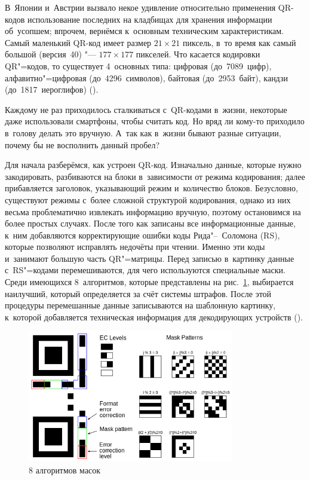 \documentclass[final,pdftex]{../../template/epsilonj}
\begin{document}
В~Японии и~Австрии вызвало некое удивление относительно применения QR-кодов использование последних на кладбищах для хранения информации об~усопшем; впрочем, вернёмся к~основным техническим характеристикам. Самый маленький QR-код имеет размер $21\times21$ пиксель, в~то время как самый большой (версия~40) "--- $177\times177$ пикселей. Что касается кодировки QR"=кодов, то существует 4~основных типа: цифровая (до~7089~цифр), алфавитно"=цифровая (до~4296~символов), байтовая (до~2953~байт), кандзи (до~1817~иероглифов) (\cite{WikiQRCodeRu}).

Каждому не раз приходилось сталкиваться с~QR-кодами в~жизни, некоторые даже использовали смартфоны, чтобы считать код. Но вряд ли кому-то приходило в~голову делать это вручную. А~так как в~жизни бывают разные ситуации, почему бы не восполнить данный пробел?

Для начала разберёмся, как устроен QR-код. Изначально данные, которые нужно закодировать, разбиваются на блоки в~зависимости от режима кодирования; далее прибавляется заголовок, указывающий режим и~количество блоков. Безусловно, существуют режимы с~более сложной структурой кодирования, однако из них весьма проблематично извлекать информацию вручную, поэтому остановимся на более простых случаях. После того как записаны все информационные данные, к~ним добавляются корректирующие ошибки коды Рида"--~Соломона (RS), которые позволяют исправлять недочёты при чтении. Именно эти коды и~занимают большую часть QR"=матрицы. Перед записью в~картинку данные с~RS"=кодами перемешиваются, для чего используются специальные маски. Среди имеющихся 8~алгоритмов, которые представлены на рис.~\ref{fig:8algs}, выбирается наилучший, который определяется за счёт системы штрафов. После этой процедуры перемешанные данные записываются на шаблонную картинку, к~которой добавляется техническая информация для декодирующих устройств (\cite{HabrQRcode}).

\begin{figure}[hbt]
			\includegraphics[width=90mm]{qr2.png}
			\caption{8 алгоритмов масок}\label{fig:8algs}
\end{figure}
\end{document}
